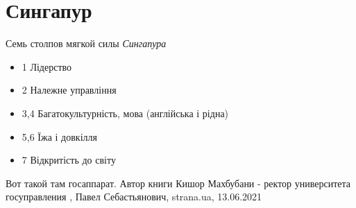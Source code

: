 
 
 
 
 
\chapter{Сингапур}

Семь столпов мягкой силы \emph{Сингапура}
\begin{itemize}
  \item 1 Лідерство
  \item 2 Належне управління
  \item 3,4 Багатокультурність, мова (англійська і рідна)
  \item 5,6 Їжа і довкілля
  \item 7 Відкритість до світу
\end{itemize}
Вот такой там госаппарат. Автор книги Кишор Махбубани - ректор университета
госуправления
, 
Павел Себастьянович, strana.ua, 13.06.2021

